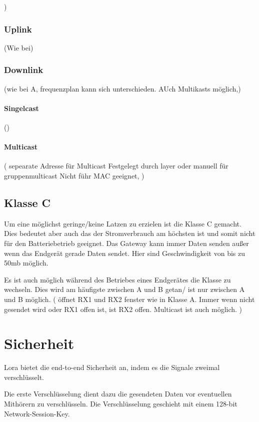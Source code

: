 \documentclass[a4paper,12pt]{article}
\begin{document}
                )
            \subsubsection{Uplink}
                \cite{LoRaSpec}(Wie bei)
            \subsubsection{Downlink}
                \cite{LoRaSpec}(wie bei A, frequenzplan kann sich unterschieden. AUch Multikasts möglich,)
                \paragraph{Singelcast}
                    \cite{LoRaSpec}()
                \paragraph{Multicast}
                    \cite{LoRaSpec}(
                        sepearate Adresse für Multicast
                        Festgelegt durch layer oder manuell für gruppenmulticast
                        Nicht führ MAC geeignet, 
                    )

        \subsection{Klasse C}
            Um eine möglichst geringe/keine Latzen zu erzielen ist die Klasse C gemacht. Dies bedeutet aber auch das der Stromverbrauch am höchsten ist und somit nicht für den Batteriebetrieb geeignet.
            Das Gateway kann immer Daten senden außer wenn das Endgerät gerade Daten sendet. Hier sind Geschwindigkeit von bis zu 50mb möglich.

            Es ist auch möglich während des Betriebes eines Endgerätes die Klasse zu wechseln. Dies wird am häufigste zwischen A und B getan/ ist nur zwischen A und B möglich.
            \cite{LoRaSpec}(
                öffnet RX1 und RX2 fenster wie in Klasse A. Immer wenn  nicht gesendet wird oder RX1 offen ist, ist RX2 offen. Multicast ist auch möglich.
            )
    \section{Sicherheit} \label{sec:Sicherheit}
        Lora bietet die end-to-end Sicherheit an, indem es die Signale zweimal verschlüsselt.

        Die erste Verschlüsselung dient dazu die gesendeten Daten vor eventuellen Mithörern zu verschlüsseln. Die Verschlüsselung geschieht mit einem 128-bit Network-Session-Key.
\end{document}
